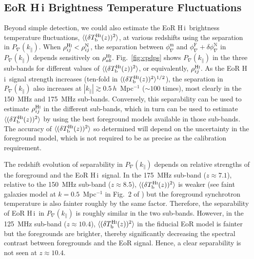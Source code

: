 \documentclass[
reprint,
superscriptaddress,
amsmath,
amssymb,
aps,
prd
]{revtex4-1}
\newcommand{\HI}{H\,{\sc i}}
\begin{document}
\subsection{EoR H\,{\sc i} Brightness Temperature Fluctuations} \label{sec:Tb-variance}

Beyond simple detection, we could also estimate the EoR \HI\ brightness temperature fluctuations, $\langle(\delta T_\textrm{b}^\textrm{H{\sc i}}(z))^2\rangle$, at various redshifts using the separation in $P_\nabla(k_\parallel)$. When $\rho_{ij}^\textrm{H{\sc i}} < \rho_{ij}^\textrm{N}$, the separation between $\phi_\nabla^\textrm{m}$ and $\phi_\nabla^\textrm{F} + \delta\phi_\nabla^\textrm{N}$ in $P_\nabla(k_\parallel)$ depends sensitively on $\rho_{ab}^\textrm{H{\sc i}}$. Fig.~\ref{fig:cpdps} shows $P_\nabla(k_\parallel)$ in the three sub-bands for different values of $\langle(\delta T_\textrm{b}^\textrm{H{\sc i}}(z))^2\rangle$, or equivalently, $\rho_{ij}^\textrm{H{\sc i}}$. As the EoR \HI\ signal strength increases (ten-fold in $\langle(\delta T_\textrm{b}^\textrm{H{\sc i}}(z))^2\rangle^{1/2}$), the separation in $P_\nabla(k_\parallel)$ also increases at $|k_\parallel| \gtrsim 0.5\,h$~Mpc$^{-1}$ ($\sim 100$ times), most clearly in the 150~MHz and 175~MHz sub-bands. Conversely, this separability can be used to estimate $\rho_{ij}^\textrm{H{\sc i}}$ in the different sub-bands, which in turn can be used to estimate $\langle(\delta T_\textrm{b}^\textrm{H{\sc i}}(z))^2\rangle$ by using the best foreground models available in those sub-bands. The accuracy of $\langle(\delta T_\textrm{b}^\textrm{H{\sc i}}(z))^2\rangle$ so determined will depend on the uncertainty in the foreground model, which is not required to be as precise as the calibration requirement.

The redshift evolution of separability in $P_\nabla(k_\parallel)$ depends on relative strengths of the foreground and the EoR \HI\ signal. In the 175~MHz sub-band ($z\approx 7.1$), relative to the 150~MHz sub-band ($z\approx 8.5$), $\langle(\delta T_\textrm{b}^\textrm{H{\sc i}}(z))^2\rangle$ is weaker (see {\sc faint galaxies} model at $k=0.5$~Mpc$^{-1}$ in Fig.~2 of \cite{gre17b}) but the foreground synchrotron temperature is also fainter roughly by the same factor. Therefore, the separability of EoR \HI\ in $P_\nabla(k_\parallel)$ is roughly similar in the two sub-bands. However, in the 125~MHz sub-band ($z\approx 10.4$), $\langle(\delta T_\textrm{b}^\textrm{H{\sc i}}(z))^2\rangle$ in the fiducial EoR model is fainter but the foregrounds are brighter, thereby significantly decreasing the spectral contrast between foregrounds and the EoR signal. Hence, a clear separability is not seen at $z\approx 10.4$.
\end{document}

